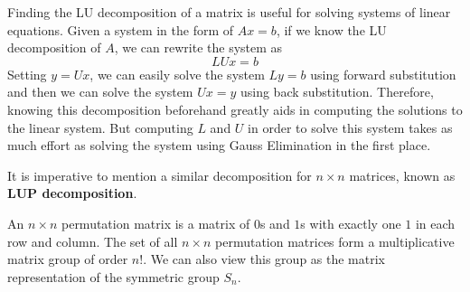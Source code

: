   Finding the LU decomposition of a matrix is useful for solving systems of linear equations. Given a system in the form of $A x = b$, if we know the LU decomposition of $A$, we can rewrite the system as 
  \begin{equation}
    L U x = b
  \end{equation}
  Setting $y = U x$, we can easily solve the system $L y = b$ using forward substitution and then we can solve the system $U x = y$ using back substitution. Therefore, knowing this decomposition beforehand greatly aids in computing the solutions to the linear system. But computing $L$ and $U$ in order to solve this system takes as much effort as solving the system using Gauss Elimination in the first place. 

  It is imperative to mention a similar decomposition for $n \times n$ matrices, known as \textbf{LUP decomposition}. 

  \begin{definition}
    An $n \times n$ permutation matrix is a matrix of $0$s and $1$s with exactly one $1$ in each row and column. The set of all $n \times n$ permutation matrices form a multiplicative matrix group of order $n!$. We can also view this group as the matrix representation of the symmetric group $S_n$. 
  \end{definition}

